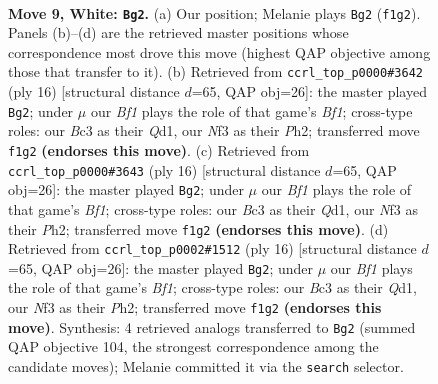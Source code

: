 \documentclass[11pt]{article}
\begin{document}
\clearpage

\begin{figure}[p]\centering
\begin{subfigure}{0.46\textwidth}\centering
\resizebox{\linewidth}{!}{%
\newchessgame
\chessboard[
  setfen={r1b2r1k/ppppqppp/2n1pn2/8/2PP4/2B1PNP1/PP3P1P/R2QKB1R w KQ - 1 9},
  showmover=false,
  pgfstyle=straightmove, color=movearrow, markmove={f1-g2}
]}
\caption{}
\end{subfigure}\hfill
\begin{subfigure}{0.46\textwidth}\centering
\resizebox{\linewidth}{!}{%
\newchessgame
\chessboard[
  setfen={r1b2rk1/ppppqppp/2n1p3/8/2PPn3/2B2NP1/PP2PP1P/2RQKB1R w K - 3 9},
  showmover=false,
  pgfstyle=straightmove, color=movearrow, markmove={f1-g2}
]}
\caption{}
\end{subfigure}
\\[4pt]
\begin{subfigure}{0.46\textwidth}\centering
\resizebox{\linewidth}{!}{%
\newchessgame
\chessboard[
  setfen={r1b2rk1/ppppqppp/2n1p3/8/2PPn3/2B2NP1/PP2PP1P/2RQKB1R w K - 3 9},
  showmover=false,
  pgfstyle=straightmove, color=movearrow, markmove={f1-g2}
]}
\caption{}
\end{subfigure}\hfill
\begin{subfigure}{0.46\textwidth}\centering
\resizebox{\linewidth}{!}{%
\newchessgame
\chessboard[
  setfen={r1b2rk1/ppppqppp/2n1p3/8/2PPn3/2B2NP1/PP2PP1P/2RQKB1R w K - 3 9},
  showmover=false,
  pgfstyle=straightmove, color=movearrow, markmove={f1-g2}
]}
\caption{}
\end{subfigure}
\caption{\textbf{Move 9, White: \texttt{Bg2}.} (a) Our position; Melanie plays \texttt{Bg2} (\texttt{f1g2}). Panels (b)--(d) are the retrieved master positions whose correspondence most drove this move (highest QAP objective among those that transfer to it). (b) Retrieved from \texttt{ccrl\_top\_p0000\#3642} (ply 16) [structural distance $d$=65, QAP obj=26]: the master played \texttt{Bg2}; under $\mu$ our \emph{Bf1} plays the role of that game's \emph{Bf1}; cross-type roles: our \emph{B}c3 as their \emph{Q}d1, our \emph{N}f3 as their \emph{P}h2; transferred move \texttt{f1g2} \textbf{(endorses this move)}. (c) Retrieved from \texttt{ccrl\_top\_p0000\#3643} (ply 16) [structural distance $d$=65, QAP obj=26]: the master played \texttt{Bg2}; under $\mu$ our \emph{Bf1} plays the role of that game's \emph{Bf1}; cross-type roles: our \emph{B}c3 as their \emph{Q}d1, our \emph{N}f3 as their \emph{P}h2; transferred move \texttt{f1g2} \textbf{(endorses this move)}. (d) Retrieved from \texttt{ccrl\_top\_p0002\#1512} (ply 16) [structural distance $d$=65, QAP obj=26]: the master played \texttt{Bg2}; under $\mu$ our \emph{Bf1} plays the role of that game's \emph{Bf1}; cross-type roles: our \emph{B}c3 as their \emph{Q}d1, our \emph{N}f3 as their \emph{P}h2; transferred move \texttt{f1g2} \textbf{(endorses this move)}. Synthesis: 4 retrieved analogs transferred to \texttt{Bg2} (summed QAP objective 104, the strongest correspondence among the candidate moves); Melanie committed it via the \texttt{search} selector.}
\label{fig:thought-m16}
\end{figure}
\end{document}
